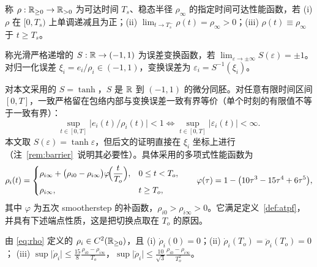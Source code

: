 \begin{definition}[指定时间可达性能函数]\label{def:atpf}
称 \(\rho:\mathbb R_{\ge0}\to\mathbb R_{>0}\) 为可达时间 \(T_s\)、稳态半径 \(\rho_\infty\) 的指定时间可达性能函数，若 \textup{(i)} \(\rho\) 在 \([0,T_s)\) 上单调递减且为正；\textup{(ii)} \(\lim_{t\to T_s^-}\rho(t)=\rho_\infty>0\)；\textup{(iii)} \(\rho(t)\equiv\rho_\infty\) 于 \(t\ge T_s\)。
\end{definition}

\begin{definition}[误差变换函数]\label{def:transform}
称光滑严格递增的 \(S:\mathbb R\to(-1,1)\) 为误差变换函数，若 \(\lim_{\varepsilon\to\pm\infty}S(\varepsilon)=\pm1\)。对归一化误差 \(\xi_i=e_i/\rho_i\in(-1,1)\)，变换误差为 \(\varepsilon_i=S^{-1}(\xi_i)\)。
\end{definition}

对本文采用的 \(S=\tanh\)，\(S\) 是 \(\mathbb R\) 到 \((-1,1)\) 的微分同胚。对任意有限时间区间 \([0,T]\)，一致严格留在包络内部与变换误差一致有界等价（单个时刻的有限值不等于一致有界）：
\begin{equation}
\sup_{t\in[0,T]}\lvert e_i(t)/\rho_i(t)\rvert<1\iff\sup_{t\in[0,T]}\lvert\varepsilon_i(t)\rvert<\infty.
\label{eq:funnel_equiv}
\end{equation}
本文取 \(S(\varepsilon)=\tanh\varepsilon\)，但后文的证明直接在 \(\xi_i\) 坐标上进行（注~\ref{rem:barrier}~说明其必要性）。具体采用的多项式性能函数为
\begin{equation}
\rho_i(t)=
\begin{cases}
\rho_{i\infty}+\bigl(\rho_{i0}-\rho_{i\infty}\bigr)\varphi\!\Bigl(\dfrac{t}{T_o}\Bigr), & 0\le t<T_o,\\[6pt]
\rho_{i\infty}, & t\ge T_o,
\end{cases}
\qquad
\varphi(\tau)=1-\bigl(10\tau^{3}-15\tau^{4}+6\tau^{5}\bigr),
\label{eq:rho}
\end{equation}
其中 \(\varphi\) 为五次 smootherstep 的补函数，\(\rho_{i0}>\rho_{i\infty}>0\)。它满足定义~\ref{def:atpf}，并具有下述端点性质，这是把切换点取在 \(T_o\) 的原因。

\begin{lemma}[性能函数的端点性质]\label{lem:rho_smooth}
由 \eqref{eq:rho} 定义的 \(\rho_i\in C^{2}(\mathbb R_{\ge0})\)，且
\textup{(i)} \(\dot\rho_i(0)=0\)；\quad\textup{(ii)} \(\dot\rho_i(T_o)=\ddot\rho_i(T_o)=0\)；\quad
\textup{(iii)} \(\sup\lvert\dot\rho_i\rvert\le\frac{15}{8}\frac{\rho_{i0}-\rho_{i\infty}}{T_o}\)，\(\sup\lvert\ddot\rho_i\rvert\le\frac{10}{\sqrt3}\frac{\rho_{i0}-\rho_{i\infty}}{T_o^{2}}\)。
\end{lemma}

